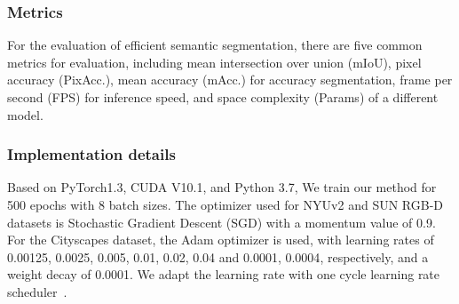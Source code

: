 \documentclass[journal,twoside,web]{ieeecolor}
\begin{document}
\subsubsection{Metrics}
For the evaluation of efficient semantic segmentation, there are five common metrics for evaluation, including mean intersection over union (mIoU), pixel accuracy (PixAcc.), mean accuracy (mAcc.) for accuracy segmentation, frame per second (FPS) for inference speed, and space complexity (Params) of a different model.

\subsubsection{Implementation details}
Based on PyTorch1.3, CUDA V10.1, and Python 3.7, We train our method for 500 epochs with 8 batch sizes. The optimizer used for NYUv2 and SUN RGB-D datasets is Stochastic Gradient Descent (SGD) with a momentum value of 0.9. For the Cityscapes dataset, the Adam optimizer is used, with learning rates of {0.00125, 0.0025, 0.005, 0.01, 0.02, 0.04} and {0.0001, 0.0004}, respectively, and a weight decay of 0.0001.  We adapt the learning rate with one cycle learning rate scheduler~\cite{EMSANet}. 
\end{document}
